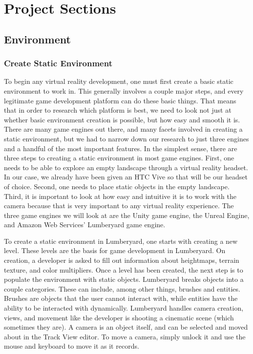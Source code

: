 \documentclass[10pt,journal,compsoc,onecolumn, draftclsnofoot]{IEEEtran}
\begin{document}
\section{Project Sections}
\subsection{Environment}
\subsubsection{Create Static Environment}
To begin any virtual reality development, one must first create a basic static environment to work in.
This generally involves a couple major steps, and every legitimate game development platform can do these basic things.
That means that in order to research which platform is best, we need to look not just at whether basic environment creation is possible, but how easy and smooth it is.
There are many game engines out there, and many facets involved in creating a static environment, but we had to narrow down our research to just three engines and a handful of the most important features.
In the simplest sense, there are three steps to creating a static environment in most game engines.
First, one needs to be able to explore an empty landscape through a virtual reality headset.
In our case, we already have been given an HTC Vive so that will be our headset of choice.
Second, one needs to place static objects in the empty landscape.
Third, it is important to look at how easy and intuitive it is to work with the camera because that is very important to any virtual reality experience.
The three game engines we will look at are the Unity game engine, the Unreal Engine, and Amazon Web Services' Lumberyard game engine.

To create a static environment in Lumberyard, one starts with creating a new level.  These levels are the basis for game development in Lumberyard. \cite{lumberyard_levels_environment}
On creation, a developer is asked to fill out information about heightmaps, terrain texture, and color multipliers.
Once a level has been created, the next step is to populate the environment with static objects.
Lumberyard breaks objects into a couple categories.  These can include, among other things, brushes and entities.
Brushes are objects that the user cannot interact with, while entities have the ability to be interacted with dynamically. \cite{lumberyard_object_system}
Lumberyard handles camera creation, views, and movement like the developer is shooting a cinematic scene (which sometimes they are).
A camera is an object itself, and can be selected and moved about in the Track View editor.
To move a camera, simply unlock it and use the mouse and keyboard to move it as it records. \cite{lumberyard_object_system}
\end{document}
